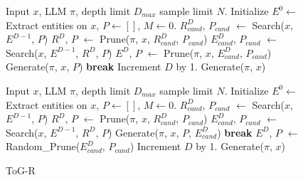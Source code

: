 \documentclass{article} %
\begin{document}
\begin{figure}[htb]
\begin{minipage}[t]{0.5\textwidth}
\begin{algorithm}[H]
\begin{algorithmic}
\Require Input $x$, LLM $\pi$, depth limit $D_{max}$ sample limit $N$.
\State Initialize $E^{0} \gets $ Extract entities on $x$, $P \gets []$, $M \gets 0$.
    \State  $R^{D}_{cand}$, $P_{cand}$  $ \gets $ Search($x$, $E^{D-1}$, $P$)
    \State $R^{D}$, $P$  $\gets $ Prune($\pi$, $x$,  $R^{D}_{cand}$, $P_{cand}$) 
    \State $E^{D}_{cand}$, $P_{cand}$  $\gets $ Search($x$, $E^{D-1}$, $R^{D}$, $P$)
    \State $E^{D}$, $P$ $\gets $ Prune($\pi$, $x$,  $E^{D}_{cand}$, $P_{cand}$)
        \State Generate($\pi$, $x$, $P$)
        \State \textbf{break}
    \EndIf
    \State Increment $D$ by 1.
\EndWhile%
    \State Generate($\pi$, $x$)
\EndIf
\caption{ToG}
\label{algorithm1}
\end{algorithmic}
\end{algorithm}
\end{minipage}
\begin{minipage}[t]{0.5\textwidth}
\begin{algorithm}[H]
\begin{algorithmic}
\Require Input $x$, LLM $\pi$, depth limit $D_{max}$ sample limit $N$.
\State Initialize $E^{0} \gets $ Extract entities on $x$, $P \gets []$, $M \gets 0$.
    \State  $R^{D}_{cand}$, $P_{cand}$  $ \gets $ Search($x$, $E^{D-1}$, $P$)
    \State $R^{D}$, $P$  $\gets $ Prune($\pi$, $x$, $R^{D}_{cand}$, $P_{cand}$) 
    \State $E^{D}_{cand}$, $P_{cand}$  $\gets $ Search($x$, $E^{D-1}$, $R^{D}$, $P$)
        \State Generate($\pi$, $x$, $P$, $E^{D}_{cand}$)
        \State \textbf{break}
    \EndIf
    \State $E^{D}$, $P$ $\gets $ Random\_Prune($E^{D}_{cand}$, $P_{cand}$)
    \State Increment $D$ by 1.
\EndWhile%
    \State Generate($\pi$, $x$)
\EndIf
\caption{ToG-R}
\label{algorithm2}
\end{algorithmic}
\end{algorithm}
\end{minipage}

\end{figure}
\end{document}
